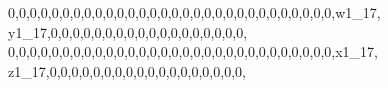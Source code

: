 \documentclass[]{article}
\newenvironment{Shaded}{\begin{snugshade}}{\end{snugshade}}
\newcommand{\DecValTok}[1]{\textcolor[rgb]{0.00,0.00,0.81}{#1}}
\newcommand{\NormalTok}[1]{#1}
\begin{document}
\begin{Shaded}
\begin{Highlighting}[]
\DecValTok{0}\NormalTok{,}\DecValTok{0}\NormalTok{,}\DecValTok{0}\NormalTok{,}\DecValTok{0}\NormalTok{,}\DecValTok{0}\NormalTok{,}\DecValTok{0}\NormalTok{,}\DecValTok{0}\NormalTok{,}\DecValTok{0}\NormalTok{,}\DecValTok{0}\NormalTok{,}\DecValTok{0}\NormalTok{,}\DecValTok{0}\NormalTok{,}\DecValTok{0}\NormalTok{,}\DecValTok{0}\NormalTok{,}\DecValTok{0}\NormalTok{,}\DecValTok{0}\NormalTok{,}\DecValTok{0}\NormalTok{,}\DecValTok{0}\NormalTok{,}\DecValTok{0}\NormalTok{,}\DecValTok{0}\NormalTok{,}\DecValTok{0}\NormalTok{,}\DecValTok{0}\NormalTok{,}\DecValTok{0}\NormalTok{,}\DecValTok{0}\NormalTok{,}\DecValTok{0}\NormalTok{,}\DecValTok{0}\NormalTok{,}\DecValTok{0}\NormalTok{,}\DecValTok{0}\NormalTok{,}\DecValTok{0}\NormalTok{,}\DecValTok{0}\NormalTok{,}\DecValTok{0}\NormalTok{,w1_}\DecValTok{17}\NormalTok{, y1_}\DecValTok{17}\NormalTok{,}\DecValTok{0}\NormalTok{,}\DecValTok{0}\NormalTok{,}\DecValTok{0}\NormalTok{,}\DecValTok{0}\NormalTok{,}\DecValTok{0}\NormalTok{,}\DecValTok{0}\NormalTok{,}\DecValTok{0}\NormalTok{,}\DecValTok{0}\NormalTok{,}\DecValTok{0}\NormalTok{,}\DecValTok{0}\NormalTok{,}\DecValTok{0}\NormalTok{,}\DecValTok{0}\NormalTok{,}\DecValTok{0}\NormalTok{,}\DecValTok{0}\NormalTok{,}\DecValTok{0}\NormalTok{,}\DecValTok{0}\NormalTok{,}\DecValTok{0}\NormalTok{,}\DecValTok{0}\NormalTok{,}
\DecValTok{0}\NormalTok{,}\DecValTok{0}\NormalTok{,}\DecValTok{0}\NormalTok{,}\DecValTok{0}\NormalTok{,}\DecValTok{0}\NormalTok{,}\DecValTok{0}\NormalTok{,}\DecValTok{0}\NormalTok{,}\DecValTok{0}\NormalTok{,}\DecValTok{0}\NormalTok{,}\DecValTok{0}\NormalTok{,}\DecValTok{0}\NormalTok{,}\DecValTok{0}\NormalTok{,}\DecValTok{0}\NormalTok{,}\DecValTok{0}\NormalTok{,}\DecValTok{0}\NormalTok{,}\DecValTok{0}\NormalTok{,}\DecValTok{0}\NormalTok{,}\DecValTok{0}\NormalTok{,}\DecValTok{0}\NormalTok{,}\DecValTok{0}\NormalTok{,}\DecValTok{0}\NormalTok{,}\DecValTok{0}\NormalTok{,}\DecValTok{0}\NormalTok{,}\DecValTok{0}\NormalTok{,}\DecValTok{0}\NormalTok{,}\DecValTok{0}\NormalTok{,}\DecValTok{0}\NormalTok{,}\DecValTok{0}\NormalTok{,}\DecValTok{0}\NormalTok{,}\DecValTok{0}\NormalTok{,x1_}\DecValTok{17}\NormalTok{, z1_}\DecValTok{17}\NormalTok{,}\DecValTok{0}\NormalTok{,}\DecValTok{0}\NormalTok{,}\DecValTok{0}\NormalTok{,}\DecValTok{0}\NormalTok{,}\DecValTok{0}\NormalTok{,}\DecValTok{0}\NormalTok{,}\DecValTok{0}\NormalTok{,}\DecValTok{0}\NormalTok{,}\DecValTok{0}\NormalTok{,}\DecValTok{0}\NormalTok{,}\DecValTok{0}\NormalTok{,}\DecValTok{0}\NormalTok{,}\DecValTok{0}\NormalTok{,}\DecValTok{0}\NormalTok{,}\DecValTok{0}\NormalTok{,}\DecValTok{0}\NormalTok{,}\DecValTok{0}\NormalTok{,}\DecValTok{0}\NormalTok{,}

\end{Highlighting}
\end{Shaded}
\end{document}
